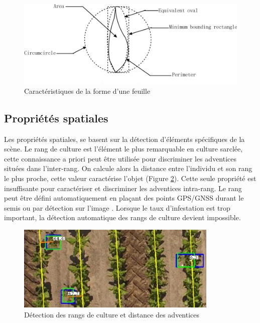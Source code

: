 \documentclass[../thesis.tex]{subfiles}
\begin{document}
    \begin{figure}[H]
        \centering
        \includegraphics[width=0.7\linewidth]{img/biblio/feature-shape-leaf}
        \caption{Caractéristiques de la forme d'une feuille }
        \label{fig:03-feature-shape-leaf}
    \end{figure}
    
    \newpage
    \subsection{Propriétés spatiales} Les propriétés spatiales, se basent sur la détection d'éléments spécifiques de la scène. Le rang de culture est l'élément le plus remarquable en culture sarclée, cette connaissance a priori peut être utilisée pour discriminer les adventices situées dans l'inter-rang. On calcule alors la distance entre l'individu et son rang le plus proche, cette valeur caractérise l'objet (Figure \ref{fig:03-feature-crop-row}). Cette seule propriété est insuffisante pour caractériser et discriminer les adventices intra-rang. Le rang peut être défini automatiquement en plaçant des points GPS/GNSS durant le semis \cite{Griepentrog2005} ou par détection sur l'image \cite{MRNL2016}. Lorsque le taux d'infestation est trop important, la détection automatique des rangs de culture devient impossible.
    
    \begin{figure}[H]
        \centering
        \includegraphics[width=0.7\linewidth]{img/biblio/feature-crop-row}
        \caption{Détection des rangs de culture et distance des adventices}
        \label{fig:03-feature-crop-row}
    \end{figure}
    
\end{document}
